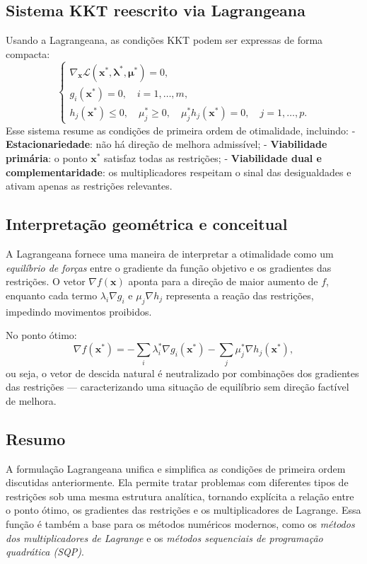 \documentclass[9pt,a4paper]{extarticle}
\begin{document}
\subsection*{Sistema KKT reescrito via Lagrangeana}

Usando a Lagrangeana, as condições KKT podem ser expressas de forma compacta:
\[
\begin{cases}
\nabla_{\bm{x}} \mathcal{L}(\bm{x}^*, \bm{\lambda}^*, \bm{\mu}^*) = 0, \\[4pt]
g_i(\bm{x}^*) = 0, \quad i=1,\dots,m, \\[2pt]
h_j(\bm{x}^*) \le 0, \quad \mu_j^* \ge 0, \quad \mu_j^* h_j(\bm{x}^*) = 0, \quad j=1,\dots,p.
\end{cases}
\]
Esse sistema resume as condições de primeira ordem de otimalidade, incluindo:
- \textbf{Estacionariedade}: não há direção de melhora admissível;
- \textbf{Viabilidade primária}: o ponto $\bm{x}^*$ satisfaz todas as restrições;
- \textbf{Viabilidade dual e complementaridade}: os multiplicadores respeitam o sinal das desigualdades e ativam apenas as restrições relevantes.

\subsection*{Interpretação geométrica e conceitual}

A Lagrangeana fornece uma maneira de interpretar a otimalidade como um \textit{equilíbrio de forças} entre o gradiente da função objetivo e os gradientes das restrições.  
O vetor $\nabla f(\bm{x})$ aponta para a direção de maior aumento de $f$, enquanto cada termo $\lambda_i \nabla g_i$ e $\mu_j \nabla h_j$ representa a reação das restrições, impedindo movimentos proibidos.

No ponto ótimo:
\[
\nabla f(\bm{x}^*) = - \sum_i \lambda_i^* \nabla g_i(\bm{x}^*) - \sum_j \mu_j^* \nabla h_j(\bm{x}^*),
\]
ou seja, o vetor de descida natural é neutralizado por combinações dos gradientes das restrições — caracterizando uma situação de equilíbrio sem direção factível de melhora.

\subsection*{Resumo}

A formulação Lagrangeana unifica e simplifica as condições de primeira ordem discutidas anteriormente.  
Ela permite tratar problemas com diferentes tipos de restrições sob uma mesma estrutura analítica, tornando explícita a relação entre o ponto ótimo, os gradientes das restrições e os multiplicadores de Lagrange.  
Essa função é também a base para os métodos numéricos modernos, como os \textit{métodos dos multiplicadores de Lagrange} e os \textit{métodos sequenciais de programação quadrática (SQP)}.
\end{document}
